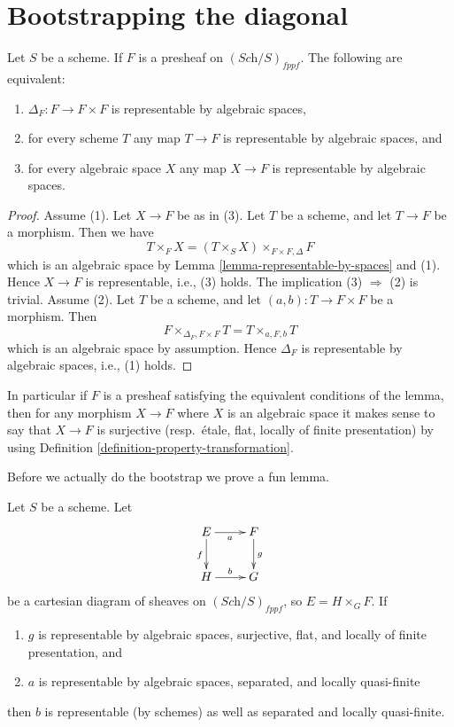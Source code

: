 \section{Bootstrapping the diagonal}
\label{section-bootstrap-diagonal}

\begin{lemma}
\label{lemma-representable-diagonal}
Let $S$ be a scheme.
If $F$ is a presheaf on $(\textit{Sch}/S)_{fppf}$.
The following are equivalent:
\begin{enumerate}
\item $\Delta_F : F \to F \times F$ is representable by algebraic spaces,
\item for every scheme $T$ any map $T \to F$ is representable by algebraic
spaces, and
\item for every algebraic space $X$ any map $X \to F$ is representable
by algebraic spaces.
\end{enumerate}
\end{lemma}

\begin{proof}
Assume (1). Let $X \to F$ be as in (3). Let $T$ be a scheme, and let
$T \to F$ be a morphism. Then we have
$$
T \times_F X = (T \times_S X) \times_{F \times F, \Delta} F
$$
which is an algebraic space by
Lemma \ref{lemma-representable-by-spaces}
and (1). Hence $X \to F$ is representable, i.e., (3) holds.
The implication (3) $\Rightarrow$ (2) is trivial. Assume (2).
Let $T$ be a scheme, and let $(a, b) : T \to F \times F$ be a morphism.
Then
$$
F \times_{\Delta_F, F \times F} T = T \times_{a, F, b} T
$$
which is an algebraic space by assumption. Hence $\Delta_F$ is
representable by algebraic spaces, i.e., (1) holds.
\end{proof}

\noindent
In particular if $F$ is a presheaf satisfying the equivalent conditions of
the lemma, then for any morphism $X \to F$ where $X$ is an algebraic space
it makes sense to say that $X \to F$ is surjective (resp.\ \'etale, flat,
locally of finite presentation) by using
Definition \ref{definition-property-transformation}.

\medskip\noindent
Before we actually do the bootstrap we prove a fun lemma.

\begin{lemma}
\label{lemma-after-fppf-sep-lqf}
Let $S$ be a scheme.
Let
$$
\xymatrix{
E \ar[r]_a \ar[d]_f & F \ar[d]^g \\
H \ar[r]^b & G
}
$$
be a cartesian diagram of sheaves on $(\textit{Sch}/S)_{fppf}$, so
$E = H \times_G F$. If
\begin{enumerate}
\item $g$ is representable by algebraic spaces, surjective, flat, and
locally of finite presentation, and
\item $a$ is representable by algebraic spaces, separated, and
locally quasi-finite
\end{enumerate}
then $b$ is representable (by schemes) as well as separated and
locally quasi-finite.
\end{lemma}

